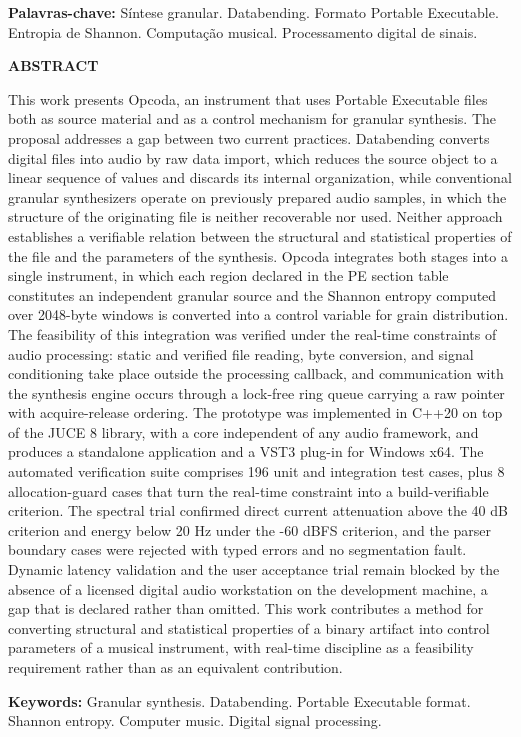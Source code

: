 \documentclass[12pt,a4paper]{article}
\begin{document}
{\vspace{4pt}\noindent\textbf{Palavras-chave:} Síntese granular. Databending. Formato Portable Executable. Entropia de Shannon. Computação musical. Processamento digital de sinais.\par

{\small\itshape

\noindent\textbf{ABSTRACT}\par\vspace{2pt}
\noindent This work presents Opcoda, an instrument that uses Portable Executable files both as source material and as a control mechanism for granular synthesis. The proposal addresses a gap between two current practices. Databending converts digital files into audio by raw data import, which reduces the source object to a linear sequence of values and discards its internal organization, while conventional granular synthesizers operate on previously prepared audio samples, in which the structure of the originating file is neither recoverable nor used. Neither approach establishes a verifiable relation between the structural and statistical properties of the file and the parameters of the synthesis. Opcoda integrates both stages into a single instrument, in which each region declared in the PE section table constitutes an independent granular source and the Shannon entropy computed over 2048-byte windows is converted into a control variable for grain distribution. The feasibility of this integration was verified under the real-time constraints of audio processing: static and verified file reading, byte conversion, and signal conditioning take place outside the processing callback, and communication with the synthesis engine occurs through a lock-free ring queue carrying a raw pointer with acquire-release ordering. The prototype was implemented in C++20 on top of the JUCE 8 library, with a core independent of any audio framework, and produces a standalone application and a VST3 plug-in for Windows x64. The automated verification suite comprises 196 unit and integration test cases, plus 8 allocation-guard cases that turn the real-time constraint into a build-verifiable criterion. The spectral trial confirmed direct current attenuation above the 40 dB criterion and energy below 20 Hz under the -60 dBFS criterion, and the parser boundary cases were rejected with typed errors and no segmentation fault. Dynamic latency validation and the user acceptance trial remain blocked by the absence of a licensed digital audio workstation on the development machine, a gap that is declared rather than omitted. This work contributes a method for converting structural and statistical properties of a binary artifact into control parameters of a musical instrument, with real-time discipline as a feasibility requirement rather than as an equivalent contribution.\par
\vspace{4pt}\noindent\textbf{Keywords:} Granular synthesis. Databending. Portable Executable format. Shannon entropy. Computer music. Digital signal processing.\par

}
}
\end{document}
